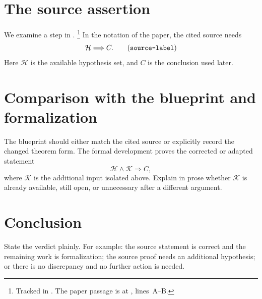 \documentclass{article}
\begin{document}
\section{The source assertion}

We examine a step in \cite{Ji2020LowIndividualDegree}.%
\footnote{Tracked in . The paper passage is at
, lines~A--B.}
In the notation of the paper, the cited source needs
\[
  \mathcal H \Longrightarrow C.
  \tag{\texttt{source-label}}
\]
Here $\mathcal H$ is the available hypothesis set, and $C$ is the conclusion
used later.

\section{Comparison with the blueprint and formalization}

The blueprint should either match the cited source or explicitly record the
changed theorem form.  The formal development proves the corrected or adapted
statement
\[
  \mathcal H \land \mathcal K \Longrightarrow C,
\]
where $\mathcal K$ is the additional input isolated above.  Explain in prose
whether $\mathcal K$ is already available, still open, or unnecessary after a
different argument.

\section{Conclusion}

State the verdict plainly.  For example: the source statement is correct and the
remaining work is formalization; the source proof needs an additional
hypothesis; or there is no discrepancy and no further action is needed.



\end{document}
